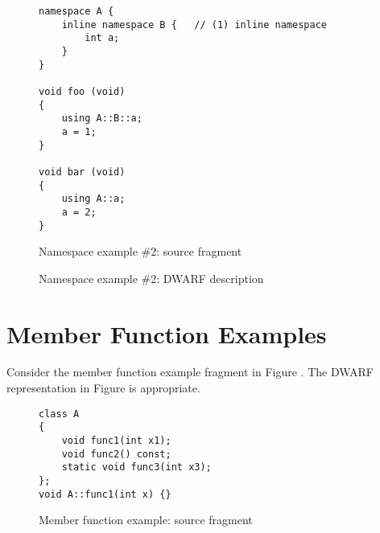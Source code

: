 \begin{figure}[ht]
\begin{lstlisting}
namespace A {
    inline namespace B {   // (1) inline namespace
        int a;
    }
}

void foo (void)
{
    using A::B::a;
    a = 1;
}

void bar (void)
{
    using A::a;
    a = 2;
}
\end{lstlisting}
\caption{Namespace example \#2: source fragment}
\label{fig:namespaceexample2sourcefragment}
\end{figure}

\begin{figure}[ht]
\caption{Namespace example \#2: DWARF description}
\label{fig:namespaceexample2dwarfdescription}
\end{figure}

\clearpage
\section{Member Function Examples}
\label{app:memberfunctionexample}
Consider the member function example fragment in 
Figure .
The DWARF representation in 
Figure 
is appropriate.

\begin{figure}[ht]
\begin{lstlisting}
class A
{
    void func1(int x1);
    void func2() const;
    static void func3(int x3);
};
void A::func1(int x) {}
\end{lstlisting}
\caption{Member function example: source fragment}
\label{fig:memberfunctionexamplesourcefragment}
\end{figure}

